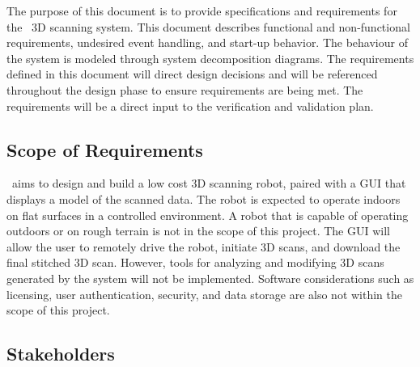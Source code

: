 \documentclass[12pt]{article}
\begin{document}
  The purpose of this document is to provide specifications and requirements for the \progname\ 3D scanning system. This document describes functional and non-functional requirements, undesired event handling, and start-up behavior. The behaviour of the system is modeled through system decomposition diagrams. The requirements defined in this document will direct design decisions and will be referenced throughout the design phase to ensure requirements are being met. The requirements will be a direct input to the verification and validation plan.

\subsection{Scope of Requirements} 
\label{sec_Scope}



\progname\ aims to design and build a low cost 3D scanning robot, paired with a GUI that displays a model of the scanned data.
The robot is expected to operate indoors on flat surfaces in a controlled environment.
A robot that is capable of operating outdoors or on rough terrain is not in the scope of this project.
The GUI will allow the user to remotely drive the robot, initiate 3D scans, and download the final stitched 3D scan.
However, tools for analyzing and modifying 3D scans generated by the system will not be implemented.
Software considerations such as licensing, user authentication, security, and data storage are also not within the scope of this project.

\subsection{Stakeholders}
\end{document}
